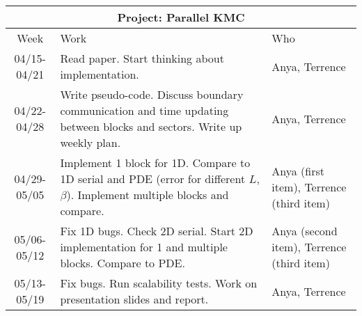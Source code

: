 \documentclass[12pt]{article}
\begin{document}
\begin{enumerate}
  \begin{center}
  \begin{tabular} {|c|p{9cm}|p{2cm}|}
    \hline
    \multicolumn{3}{|c|}{\bf Project: Parallel KMC} \\
    \hline
    Week & Work & Who  \\ \hline \hline
    04/15-04/21 & Read paper.  Start thinking about
    implementation. & Anya, Terrence \\ \hline
    04/22-04/28 & Write pseudo-code.  Discuss boundary communication and time updating between blocks and sectors.
    Write up weekly plan. & Anya, Terrence \\ \hline
    04/29-05/05 & Implement 1 block for 1D.  Compare to 1D serial and PDE (error for different $L$, $\beta$). Implement multiple blocks and compare.  & Anya (first item), Terrence (third item)  \\ \hline
    05/06-05/12 & Fix 1D bugs.  Check 2D serial.  Start 2D implementation for 1 and multiple blocks.  Compare to PDE. & Anya (second item), Terrence (third item) \\ \hline
    05/13-05/19 & Fix bugs.  Run scalability tests. Work on
    presentation slides and report.  & Anya, Terrence \\ \hline
  \end{tabular}
  \end{center}



\end{enumerate}
\end{document}
